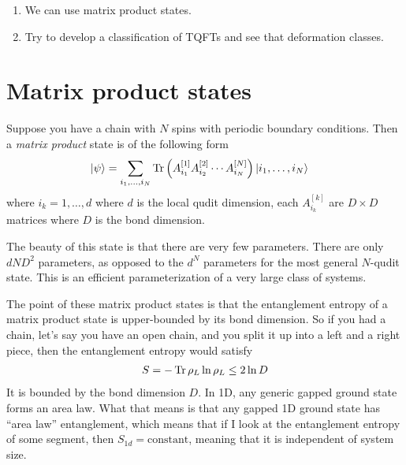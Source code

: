 \begin{enumerate}
    \item We can use matrix product states.
    \item Try to develop a classification of TQFTs and see that deformation
        classes.
\end{enumerate}

\section{Matrix product states}
Suppose you have a chain with $N$ spins with periodic boundary conditions.
Then a \emph{matrix product} state is of the following form
\begin{align}
    \ket{\psi} &=
    \sum_{i_1,\ldots,i_N} 
    \Tr\left( 
    A_{i_1}^{[1]}
    A_{i_2}^{[2]}
    \cdots
    A_{i_N}^{[N]}
    \right)
    \ket{i_1,\ldots,i_N}
\end{align}
where $i_k=1,\ldots,d$ where $d$ is the local qudit dimension,
each $A_{i_k}^{[k]}$ are $D\times D$ matrices
where $D$ is the bond dimension.

The beauty of this state is that there are very few parameters.
There are only $dND^2$ parameters,
as opposed to the $d^N$ parameters for the most general $N$-qudit state.
This is an efficient parameterization of a very large class of systems.

The point of these matrix product states is that the entanglement entropy of a
matrix product state is upper-bounded by its bond dimension.
So if you had a chain,
let's say you have an open chain,
and you split it up into a left and a right piece,
then the entanglement entropy would satisfy
\begin{align}
    S = -\Tr \rho_L \ln \rho_L \le 2 \ln D
\end{align}
It is bounded by the bond dimension $D$.
In 1D,
any generic gapped ground state forms an area law.
What that means is that any gapped 1D ground state has ``area law''
entanglement,
which means that if I look at the entanglement entropy of some segment,
then $S_{1d}=\mathrm{constant}$,
meaning that it is independent of system size.

